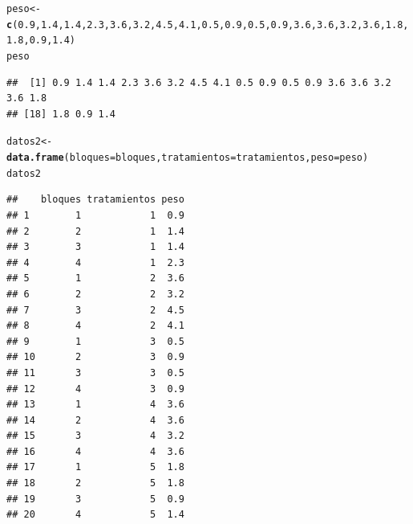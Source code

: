 \documentclass[12pt,letterpaper]{article}\usepackage[]{graphicx}\usepackage[]{color}
\makeatletter
\newcommand{\hlnum}[1]{\textcolor[rgb]{0.686,0.059,0.569}{#1}}%
\newcommand{\hlstd}[1]{\textcolor[rgb]{0.345,0.345,0.345}{#1}}%
\newcommand{\hlkwb}[1]{\textcolor[rgb]{0.69,0.353,0.396}{#1}}%
\newcommand{\hlkwc}[1]{\textcolor[rgb]{0.333,0.667,0.333}{#1}}%
\newcommand{\hlkwd}[1]{\textcolor[rgb]{0.737,0.353,0.396}{\textbf{#1}}}%
\newenvironment{kframe}{%
 \def\at@end@of@kframe{}%
 \ifinner\ifhmode%
  \def\at@end@of@kframe{\end{minipage}}%
  \begin{minipage}{\columnwidth}%
 \fi\fi%
 \def\FrameCommand##1{\hskip\@totalleftmargin \hskip-\fboxsep
 \colorbox{shadecolor}{##1}\hskip-\fboxsep
     \hskip-\linewidth \hskip-\@totalleftmargin \hskip\columnwidth}%
 \MakeFramed {\advance\hsize-\width
   \@totalleftmargin\z@ \linewidth\hsize
   \@setminipage}}%
 {\par\unskip\endMakeFramed%
 \at@end@of@kframe}
\newenvironment{knitrout}{}{} %
\makeatother
\begin{document}
\begin{knitrout}
\begin{kframe}
\begin{alltt}
\hlstd{peso} \hlkwb{<-} \hlkwd{c}\hlstd{(}\hlnum{0.9}\hlstd{,} \hlnum{1.4}\hlstd{,} \hlnum{1.4}\hlstd{,} \hlnum{2.3}\hlstd{,} \hlnum{3.6}\hlstd{,} \hlnum{3.2}\hlstd{,} \hlnum{4.5}\hlstd{,} \hlnum{4.1}\hlstd{,} \hlnum{0.5}\hlstd{,} \hlnum{0.9}\hlstd{,} \hlnum{0.5}\hlstd{,} \hlnum{0.9}\hlstd{,} \hlnum{3.6}\hlstd{,} \hlnum{3.6}\hlstd{,} \hlnum{3.2}\hlstd{,} \hlnum{3.6}\hlstd{,} \hlnum{1.8}\hlstd{,} \hlnum{1.8}\hlstd{,} \hlnum{0.9}\hlstd{,} \hlnum{1.4} \hlstd{)}
\hlstd{peso}
\end{alltt}
\begin{verbatim}
##  [1] 0.9 1.4 1.4 2.3 3.6 3.2 4.5 4.1 0.5 0.9 0.5 0.9 3.6 3.6 3.2 3.6 1.8
## [18] 1.8 0.9 1.4
\end{verbatim}
\begin{alltt}
\hlstd{datos2} \hlkwb{<-} \hlkwd{data.frame}\hlstd{(}\hlkwc{bloques} \hlstd{= bloques,} \hlkwc{tratamientos} \hlstd{= tratamientos,} \hlkwc{peso} \hlstd{= peso)}
\hlstd{datos2}
\end{alltt}
\begin{verbatim}
##    bloques tratamientos peso
## 1        1            1  0.9
## 2        2            1  1.4
## 3        3            1  1.4
## 4        4            1  2.3
## 5        1            2  3.6
## 6        2            2  3.2
## 7        3            2  4.5
## 8        4            2  4.1
## 9        1            3  0.5
## 10       2            3  0.9
## 11       3            3  0.5
## 12       4            3  0.9
## 13       1            4  3.6
## 14       2            4  3.6
## 15       3            4  3.2
## 16       4            4  3.6
## 17       1            5  1.8
## 18       2            5  1.8
## 19       3            5  0.9
## 20       4            5  1.4
\end{verbatim}
\end{kframe}
\end{knitrout}
\end{document}
